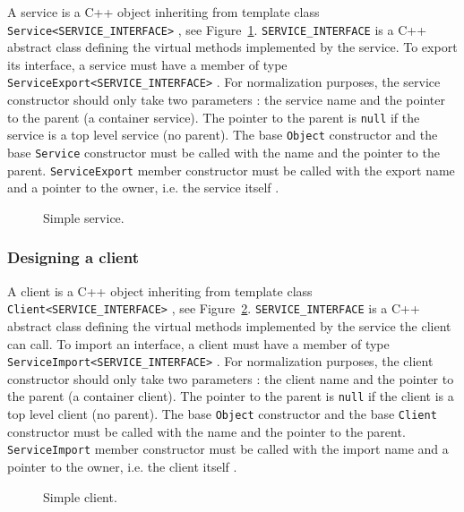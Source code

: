 A service is a C++ object inheriting from template class \texttt{Service<SERVICE\_INTERFACE>} , see Figure~\ref{fig:tms320c3x_simple_service}.
\texttt{SERVICE\_INTERFACE} is a C++ abstract class defining the virtual methods implemented by the service.
To export its interface, a service must have a member of type \texttt{ServiceExport<SERVICE\_INTERFACE>} .
For normalization purposes, the service constructor should only take two parameters : the service name and the pointer to the parent (a container service).
The pointer to the parent is \texttt{null} if the service is a top level service (no parent).
The base \texttt{Object} constructor  and the base \texttt{Service} constructor  must be called with the name and the pointer to the parent.
\texttt{ServiceExport} member constructor must be called with the export name and a pointer to the owner, i.e. the service itself .

\begin{figure}[h]
  \begin{center}
    
    \caption{\label{fig:tms320c3x_simple_service} Simple service.}
  \end{center}
\end{figure}

\subsubsection{Designing a client}

A client is a C++ object inheriting from template class \texttt{Client<SERVICE\_INTERFACE>} , see Figure~\ref{fig:tms320c3x_simple_client}.
\texttt{SERVICE\_INTERFACE} is a C++ abstract class defining the virtual methods implemented by the service the client can call.
To import an interface, a client must have a member of type \texttt{ServiceImport<SERVICE\_INTERFACE>} .
For normalization purposes, the client constructor should only take two parameters : the client name and the pointer to the parent (a container client).
The pointer to the parent is \texttt{null} if the client is a top level client (no parent).
The base \texttt{Object} constructor  and the base \texttt{Client} constructor  must be called with the name and the pointer to the parent.
\texttt{ServiceImport} member constructor must be called with the import name and a pointer to the owner, i.e. the client itself .


\begin{figure}[h]
  \begin{center}
    
    \caption{\label{fig:tms320c3x_simple_client} Simple client.}
  \end{center}
\end{figure}

